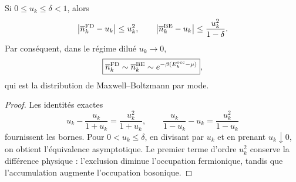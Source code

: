 \begin{theorem}
\label{thm:limite-clasico-fd-be-rev2}
Si \(0\leq u_k\leq\delta<1\), alors
\[
 \left|\overline n_k^{\rm FD}-u_k\right|\leq u_k^2,
 \qquad
 \left|\overline n_k^{\rm BE}-u_k\right|
 \leq\frac{u_k^2}{1-\delta}.
\]
Par conséquent, dans le régime dilué \(u_k\to0\),
\[
 \boxed{
 \overline n_k^{\rm FD}\sim
 \overline n_k^{\rm BE}\sim
 e^{-\beta(E_k^{\rm occ}-\mu)}} ,
\]
qui est la distribution de Maxwell--Boltzmann par mode.
\end{theorem}

\begin{proof}
Les identités exactes
\[
 u_k-\frac{u_k}{1+u_k}=\frac{u_k^2}{1+u_k},
 \qquad
 \frac{u_k}{1-u_k}-u_k=\frac{u_k^2}{1-u_k}
\]
fournissent les bornes. Pour \(0<u_k\leq\delta\), en divisant par \(u_k\) et
en prenant \(u_k\downarrow0\), on obtient
l’équivalence asymptotique. Le premier terme d’ordre \(u_k^2\) conserve la
différence physique : l’exclusion diminue l’occupation fermionique, tandis que
l’accumulation augmente l’occupation bosonique.
\end{proof}
